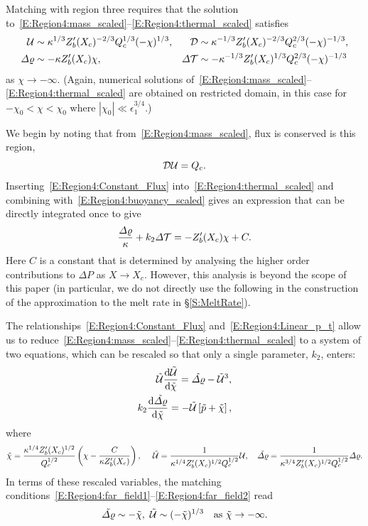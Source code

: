 \documentclass[openacc]{rsproca_new}%
\newcommand{\dd}[2]{\frac{\mathrm{d} #1}{\mathrm{d} #2}}
\newcommand{\epsone}{\epsilon_{1}} %
\begin{document}
Matching with region three requires that the solution to~\eqref{E:Region4:mass_scaled}--\eqref{E:Region4:thermal_scaled} satisfies
\begin{align}
\mathcal{U} &\sim \kappa^{1/3}Z_b'(X_c)^{-2/3}Q_c^{1/3} (-\chi)^{1/3}, &  \mathcal{D} &\sim \kappa^{-1/3} Z_b'(X_c)^{-2/3} Q_c^{2/3}(-\chi)^{-1/3}\label{E:Region4:far_field1},\\
\varDelta \varrho &\sim - \kappa Z_b'(X_c) \chi, & \varDelta \mathcal{T} &\sim -\kappa^{-1/3} Z_b'(X_c)^{1/3} Q_c^{2/3}(-\chi)^{-1/3}\label{E:Region4:far_field2}
\end{align}
as $\chi \to -\infty$. (Again, numerical solutions of~\eqref{E:Region4:mass_scaled}--\eqref{E:Region4:thermal_scaled} are obtained on restricted domain, in this case for $-\chi_0 < \chi < \chi_0$ where $|\chi_0| \ll \epsone^{3/4}$.)

We begin by noting that from~\eqref{E:Region4:mass_scaled}, flux is conserved is this region,
\begin{equation}\label{E:Region4:Constant_Flux}
\mathcal{D}\mathcal{U}  = Q_c.
\end{equation}
Inserting~\eqref{E:Region4:Constant_Flux} into~\eqref{E:Region4:thermal_scaled} and combining with~\eqref{E:Region4:buoyancy_scaled} gives an expression that can be directly integrated once to give
\begin{equation}\label{E:Region4:Linear_p_t}
\frac{\varDelta \varrho}{\kappa} + k_2 \varDelta \mathcal{T} = -Z_b'(X_c)\chi + C.
\end{equation}
Here $C$ is a constant that is determined by analysing the higher order contributions to $\Delta P$ as $X \to X_c$. However, this analysis is beyond the scope of this paper (in particular, we do not directly use the following in the construction of the approximation to the melt rate in \S\ref{S:MeltRate}).

The relationships~\eqref{E:Region4:Constant_Flux} and~\eqref{E:Region4:Linear_p_t} allow us to reduce~\eqref{E:Region4:mass_scaled}--\eqref{E:Region4:thermal_scaled} to a system of two equations, which can be rescaled so that only a single parameter, $k_2$, enters:
\begin{align}
\tilde{\U} \dd{\tilde{\U}}{\tilde{\chi}} = \tilde{\p} - \tilde{\U}^3,\label{E:Region4:rescaled1}\\
k_2  \dd{\tilde{\p}}{\tilde{\chi}} = -\tilde{\U}\left[\tilde{p} + \tilde{\chi}\right],\label{E:Region4:rescaled2}
\end{align}
where
\begin{equation*}\label{E:Region4:Rescaling}
\tilde{\chi} = \frac{\kappa^{1/4}Z_b'(X_c)^{1/2}}{Q_c^{1/2}}\left(\chi - \frac{C}{\kappa Z_b'(X_c)}\right), ~\quad  \tilde{\mathcal{U}} = \frac{1}{\kappa^{1/4}Z_b'(X_c)^{1/2}Q_c^{1/2}}\mathcal{U},\quad \tilde{\varDelta \varrho}= \frac{1}{\kappa^{3/4}Z_b'(X_c)^{ 1/2}Q_c^{1/2}}\varDelta \varrho.
\end{equation*} 
In terms of these rescaled variables, the matching conditions~\eqref{E:Region4:far_field1}--\eqref{E:Region4:far_field2} read
\begin{equation}\label{E:Region4:Rescaled_farfield}
\tilde{\varDelta \varrho} \sim -\tilde{\chi},~ \tilde{\mathcal{U}}\sim (-\tilde{\chi})^{1/3}\quad \text{as}~\tilde{\chi}\to -\infty.
\end{equation}
\end{document}
